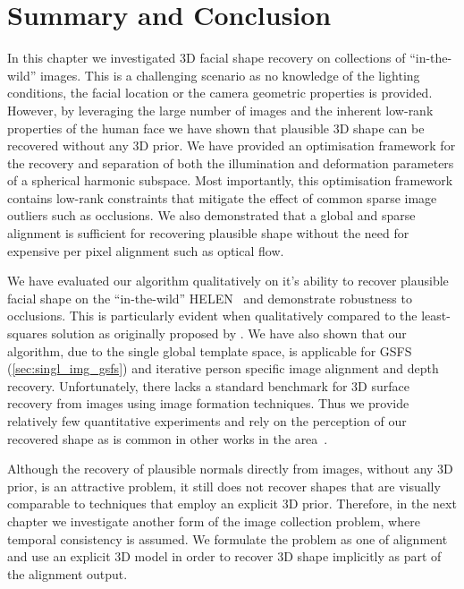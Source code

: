 \section{Summary and Conclusion}\label{sec:imag_coll_summary}
In this chapter we investigated 3D facial shape recovery on collections of
``in-the-wild'' images. This is a challenging scenario as no knowledge of the
lighting conditions, the facial location or the camera geometric properties is
provided. However, by leveraging the large number of images and the inherent
low-rank properties of the human face we have shown that plausible 3D shape
can be recovered without any 3D prior. We have provided an optimisation
framework for the recovery and separation of both the illumination and
deformation parameters of a spherical harmonic subspace. Most importantly,
this optimisation framework contains low-rank constraints that mitigate the
effect of common sparse image outliers such as occlusions. We also demonstrated
that a global and sparse alignment is sufficient for recovering plausible shape
without the need for expensive per pixel alignment such as optical flow.

We have evaluated our algorithm qualitatively on it's ability to recover
plausible facial shape on the ``in-the-wild'' HELEN~\cite{le2012interactive}
and demonstrate robustness to occlusions. This is particularly evident when
qualitatively compared to the least-squares solution as originally proposed by
\citet{KemelmacherShlizerman:2013iv}. We have also shown that our algorithm,
due to the single global template space, is applicable for
GSFS (\cref{sec:singl_img_gsfs}) and iterative person specific image alignment
and depth recovery. Unfortunately, there lacks a standard benchmark for
3D surface recovery from images using image formation techniques. Thus we provide
relatively few quantitative experiments and rely on the perception of our
recovered shape as is common in other works in the
area~\cite{KemelmacherShlizerman:2013iv,kemelmacher2011face,kemelmacher2012collection}.

Although the recovery of plausible normals directly from images, without any
3D prior, is an attractive problem, it still does not recover shapes that
are visually comparable to techniques that employ an explicit 3D prior. Therefore,
in the next chapter we investigate another form of the image collection problem,
where temporal consistency is assumed. We formulate the problem as one of alignment
and use an explicit 3D model in order to recover 3D shape implicitly as part
of the alignment output.
